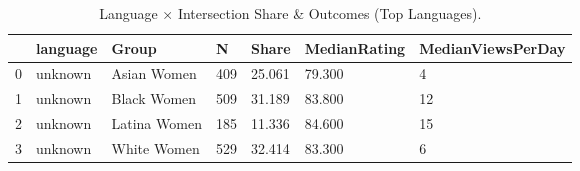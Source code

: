 \begin{table}[htbp]
\centering
\caption{Language × Intersection Share & Outcomes (Top Languages).}
\label{tab:eda_language_by_intersection}
\begin{tabular}{lllllll}
\toprule
 & language & Group & N & Share & MedianRating & MedianViewsPerDay \\
\midrule
0 & unknown & Asian Women & 409 & 25.061 & 79.300 & 4 \\
1 & unknown & Black Women & 509 & 31.189 & 83.800 & 12 \\
2 & unknown & Latina Women & 185 & 11.336 & 84.600 & 15 \\
3 & unknown & White Women & 529 & 32.414 & 83.300 & 6 \\
\bottomrule
\end{tabular}

\end{table}